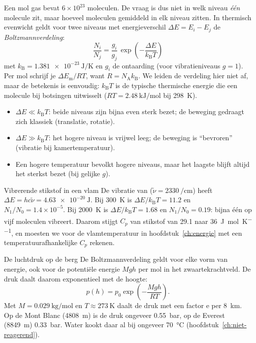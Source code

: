 Een mol gas bevat $6\times10^{23}$ moleculen. De vraag is dus niet in welk niveau \emph{één} molecule zit, maar hoeveel moleculen gemiddeld in elk niveau zitten. In thermisch evenwicht geldt voor twee niveaus met energieverschil $\Delta E = E_i - E_j$ de \emph{Boltzmannverdeling}:
\begin{equation}
\boxed{\frac{N_i}{N_j} = \frac{g_i}{g_j}\,\exp\!\left(-\frac{\Delta E}{k_\mathrm{B}T}\right)}
\label{eq:boltzmann}
\end{equation}
met $k_\mathrm{B} = \SI{1.381e-23}{\joule\per\kelvin}$ en $g_i$ de ontaarding (voor vibratieniveaus $g = 1$). Per mol schrijf je $\Delta E_\mathrm{m}/RT$, want $R = N_\mathrm{A}k_\mathrm{B}$. We leiden de verdeling hier niet af, maar de betekenis is eenvoudig: $k_\mathrm{B}T$ is de typische thermische energie die een molecule bij botsingen uitwisselt ($RT = \SI{2.48}{\kilo\joule\per\mole}$ bij \SI{298}{\kelvin}).
\begin{itemize}
\item $\Delta E \ll k_\mathrm{B}T$: beide niveaus zijn bijna even sterk bezet; de beweging gedraagt zich klassiek (translatie, rotatie).
\item $\Delta E \gg k_\mathrm{B}T$: het hogere niveau is vrijwel leeg; de beweging is ``bevroren'' (vibratie bij kamertemperatuur).
\item Een hogere temperatuur bevolkt hogere niveaus, maar het laagste blijft altijd het sterkst bezet (bij gelijke $g$).
\end{itemize}

\begin{voorbeeld}{Vibrerende stikstof in een vlam}
De vibratie van  ($\tilde\nu = \SI{2330}{\per\centi\metre}$) heeft $\Delta E = hc\tilde\nu = \SI{4.63e-20}{\joule}$. Bij \SI{300}{\kelvin} is $\Delta E/k_\mathrm{B}T = 11.2$ en $N_1/N_0 = 1.4\times10^{-5}$. Bij \SI{2000}{\kelvin} is $\Delta E/k_\mathrm{B}T = 1.68$ en $N_1/N_0 = 0.19$: bijna één op vijf moleculen vibreert. Daarom stijgt $C_p$ van stikstof van \SI{29.1}{} naar \SI{36}{\joule\per\mole\per\kelvin}, en moesten we voor de vlamtemperatuur in hoofdstuk~\ref{ch:energie} met een temperatuurafhankelijke $C_p$ rekenen.
\end{voorbeeld}

\begin{toepassing}{De luchtdruk op de berg}
De Boltzmannverdeling geldt voor elke vorm van energie, ook voor de potentiële energie $Mgh$ per mol in het zwaartekrachtveld. De druk daalt daarom exponentieel met de hoogte:
\begin{equation}
p(h) = p_0 \exp\!\left(-\frac{Mgh}{RT}\right).
\end{equation}
Met $M = \SI{0.029}{\kilo\gram\per\mole}$ en $T \approx \SI{273}{\kelvin}$ daalt de druk met een factor $\mathrm{e}$ per \SI{8}{\kilo\metre}. Op de Mont Blanc (\SI{4808}{\metre}) is de druk ongeveer \SI{0.55}{\bar}, op de Everest (\SI{8849}{\metre}) \SI{0.33}{\bar}. Water kookt daar al bij ongeveer \SI{70}{\celsius} (hoofdstuk~\ref{ch:niet-reagerend}).
\end{toepassing}

